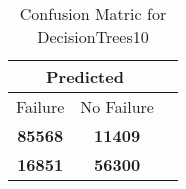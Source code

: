 \begin{table}[] 
\caption{Confusion Matric for DecisionTrees10} 
\label{Table: Prediction Accuracy-DMDDecisionTrees10OnlySunEKF-ignoreReflection-Reflection} 
\centering 
\begin{tabular} 
 {@{}ccc@{}} 
\toprule 
\multicolumn{2}{c}{\textbf{Predicted}}
 \\ \midrule 
\multicolumn{1}{|c|}{Failure} & 
\multicolumn{1}{c|}{No Failure}
 \\ \midrule 
\multicolumn{1}{|c|}{\color{green}\textbf{85568}} & 
\multicolumn{1}{c|}{\color{red}\textbf{11409}}
 \\ \midrule 
\multicolumn{1}{|c|}{\color{red}\textbf{16851}} & 
\multicolumn{1}{c|}{\color{green}\textbf{56300}}
 \\ \bottomrule 
\end{tabular} 
\end{table} 
